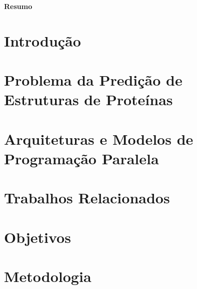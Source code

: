 \documentclass[12pt,a4paper]{article}
\makeatletter
\renewcommand\tableofcontents{%
    \section*{\huge\centering\contentsname
        \@mkboth{%
           \MakeUppercase\contentsname}{\MakeUppercase\contentsname}}%
           \vspace{24pt}%
    \@starttoc{toc}%
    \newpage%
}
\makeatother
\begin{document}
\pagestyle{empty}
\begin{center}
    {\bf \huge Resumo} \\[3em] %
\end{center}



\noindent{}
\newpage
\pagestyle{empty} %
\tableofcontents
\newpage
\setcounter{page}{1}
\pagestyle{plain} %

\section{Introdução}
\label{section:introducao}


\section{Problema da Predição de Estruturas de Proteínas}
\label{section:problemapsp}


\section{Arquiteturas e Modelos de Programação Paralela}
\label{section:hpc}


\section{Trabalhos Relacionados}
\label{section:trabrelacionados}


\section{Objetivos}
\label{section:objetivos}


\section{Metodologia}
\label{section:metodologia}



\newpage



\end{document}
